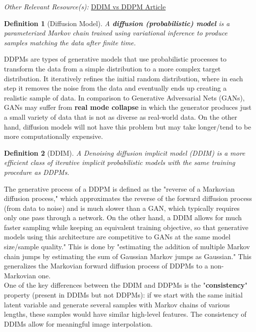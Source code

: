 \documentclass{article}
\newtheorem{definition}{Definition}
\begin{document}
\textit{Other Relevant Resource(s):} \href{https://strikingloo.github.io/wiki/ddim#:~:text=Properties%20of%20DDIM%20vs%20DDPM,have%20similar%20high%2Dlevel%20features}{DDIM vs DDPM Article}

\begin{definition}[Diffusion Model]
A \textbf{diffusion (probabilistic) model} is a parameterized Markov chain trained using variational inference to produce samples matching the data after finite time.  
\end{definition}

DDPMs are types of generative models that use probabilistic processes to transform the data from a simple distribution to a more complex target distribution. It iteratively refines the initial random distribution, where in each step it removes the noise from the data and eventually ends up creating a realistic sample of data. In comparison to Generative Adversarial Nets (GANs), GANs may suffer from \textbf{real mode collapse} in which the generator produces just a small variety of data that is not as diverse as real-world data. On the other hand, diffusion models will not have this problem but may take longer/tend to be more computationally expensive. \\

\begin{definition}[DDIM]
A Denoising diffusion implicit model (DDIM) is a more efficient class of iterative implicit probabilistic models with the same training procedure as DDPMs.
\end{definition}

The generative process of a DDPM is defined as the "reverse of a Markovian diffusion process," which approximates the reverse of the forward diffusion process (from data to noise) and is much slower than a GAN, which typically requires only one pass through a network. On the other hand, a DDIM allows for much faster sampling while keeping an equivalent training objective, so that generative models using this architecture are competitive to GANs at the same model size/sample quality." This is done by "estimating the addition of multiple Markov chain jumps by estimating the sum of Gaussian Markov jumps as Gaussian." This generalizes the Markovian forward diffusion process of DDPMs to a non-Markovian one. \\

One of the key differences between the DDIM and DDPMs is the "\textbf{consistency}" property (present in DDIMs but not DDPMs): if we start with the same initial latent variable and generate several samples with Markov chains of various lengths, these samples would have similar high-level features. The consistency of DDIMs allow for meaningful image interpolation. 
\end{document}
